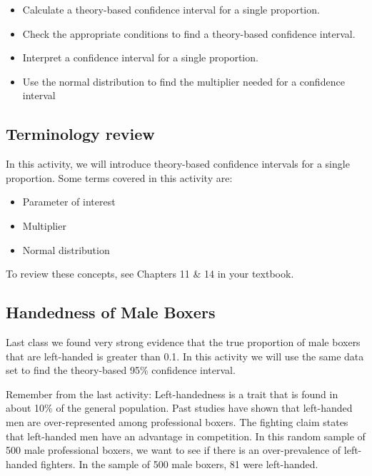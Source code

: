 \documentclass[
]{report}
\begin{document}
\begin{itemize}
\item
  Calculate a theory-based confidence interval for a single proportion.
\item
  Check the appropriate conditions to find a theory-based confidence interval.
\item
  Interpret a confidence interval for a single proportion.
\item
  Use the normal distribution to find the multiplier needed for a confidence interval
\end{itemize}

\hypertarget{terminology-review-11}{%
\subsection{Terminology review}\label{terminology-review-11}}

In this activity, we will introduce theory-based confidence intervals for a single proportion. Some terms covered in this activity are:

\begin{itemize}
\item
  Parameter of interest
\item
  Multiplier
\item
  Normal distribution
\end{itemize}

To review these concepts, see Chapters 11 \& 14 in your textbook.

\hypertarget{handedness-of-male-boxers-1}{%
\subsection{Handedness of Male Boxers}\label{handedness-of-male-boxers-1}}

Last class we found very strong evidence that the true proportion of male boxers that are left-handed is greater than 0.1. In this activity we will use the same data set to find the theory-based 95\% confidence interval.

Remember from the last activity: Left-handedness is a trait that is found in about 10\% of the general population. Past studies have shown that left-handed men are over-represented among professional boxers. The fighting claim states that left-handed men have an advantage in competition. In this random sample of 500 male professional boxers, we want to see if there is an over-prevalence of left-handed fighters. In the sample of 500 male boxers, 81 were left-handed.
\end{document}
